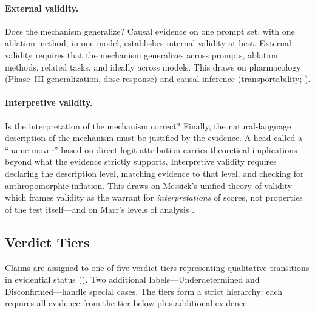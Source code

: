 \documentclass{article}
\begin{document}
\paragraph{External validity.} Does the mechanism generalize? Causal evidence on one prompt set, with one ablation method, in one model, establishes internal validity at best. External validity requires that the mechanism generalizes across prompts, ablation methods, related tasks, and ideally across models. This draws on pharmacology (Phase~III generalization, dose-response) and causal inference (transportability; \citealp{pearl2011transportability}).

\paragraph{Interpretive validity.} Is the interpretation of the mechanism correct? Finally, the natural-language description of the mechanism must be justified by the evidence. A head called a ``name mover'' based on direct logit attribution carries theoretical implications beyond what the evidence strictly supports. Interpretive validity requires declaring the description level, matching evidence to that level, and checking for anthropomorphic inflation. This draws on Messick's unified theory of validity \citep{messick1995validity}---which frames validity as the warrant for \emph{interpretations} of scores, not properties of the test itself---and on Marr's levels of analysis \citep{marr1982vision}.

\subsection{Verdict Tiers}
\label{sec:verdict-tiers}

Claims are assigned to one of five verdict tiers representing qualitative transitions in evidential status (). Two additional labels---Underdetermined and Disconfirmed---handle special cases. The tiers form a strict hierarchy: each requires all evidence from the tier below plus additional evidence.
\end{document}
